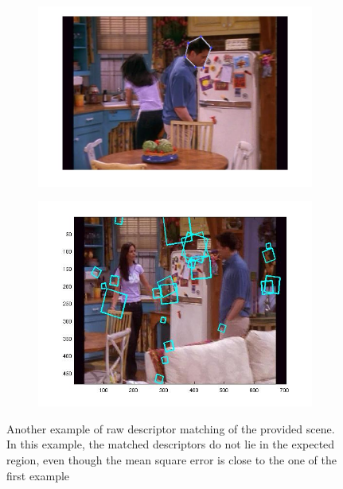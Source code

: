 \documentclass{paper}
\begin{document}
\begin{figure}
  \centering
  \begin{subfigure}[b]{0.7\textwidth}
    \includegraphics[width=\textwidth]{raw_fail_selection}
  \end{subfigure}
  \begin{subfigure}[b]{0.7\textwidth}
    \includegraphics[width=\textwidth]{raw_fail_all}
  \end{subfigure}
\caption{Another example of raw descriptor matching of the provided scene.
In this example, the matched descriptors do not lie in the expected region, even though
the mean square error is close to the one of the first example}
\label{fig:raw_fail}
\end{figure}
\end{document}
